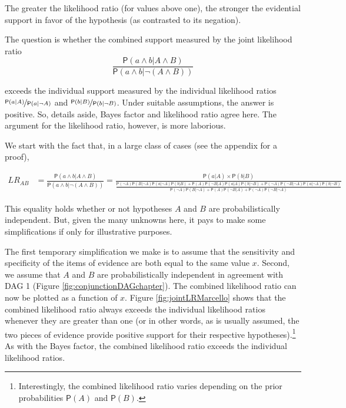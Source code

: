 \documentclass[
  10pt,
  dvipsnames,enabledeprecatedfontcommands]{scrartcl}
\newcommand{\pr}[1]{\ensuremath{\mathsf{P}(#1)}}
\begin{document}
\noindent The greater the likelihood ratio (for values above one), the
stronger the evidential support in favor of the hypothesis (as
contrasted to its negation).

The question is whether the combined support measured by the joint
likelihood ratio
\[\frac{\pr{a\wedge b \vert A\wedge B}}{\pr{a \wedge b \vert \neg (A\wedge B)}}\]

\noindent exceeds the individual support measured by the individual
likelihood ratios \(\nicefrac{\pr{a \vert A}}{\pr{a \vert \neg A}}\) and
\(\nicefrac{\pr{b \vert B}}{\pr{b \vert \neg B}}\). Under suitable
assumptions, the answer is positive. So, details aside, Bayes factor and
likelihood ratio agree here. The argument for the likelihood ratio,
however, is more laborious.

We start with the fact that, in a large class of cases (see the appendix
for a proof),

\begin{align*}
LR_{AB} & = \frac{\pr{a\wedge b \vert A\wedge B}}{\pr{a \wedge b \vert \neg (A\wedge B)}} = \frac{\pr{a \vert A} \times \pr{b \vert B}}
 {\frac{\pr{\neg A}\pr{B \vert \neg A} \pr{a \vert \neg A}\pr{b \vert B} + \pr{A}\pr{\neg B \vert A} \pr{a \vert A }\pr{b \vert \neg B} + \pr{\neg A}\pr{\neg B \vert \neg A } \pr{a \vert \neg A}\pr{b \vert \neg B}}{\pr{\neg A}\pr{B \vert \neg A} + \pr{A}\pr{\neg B \vert A } + \pr{\neg A}\pr{\neg B \vert \neg A} }}
\end{align*}

\noindent This equality holds whether or not hypotheses \(A\) and \(B\)
are probabilistically independent. But, given the many unknowns here, it
pays to make some simplifications if only for illustrative purposes.

The first temporary simplification we make is to assume that the
sensitivity and specificity of the items of evidence are both equal to
the same value \(x\). Second, we assume that \(A\) and \(B\) are
probabilistically independent in agreement with \textsf{DAG 1} (Figure
\ref{fig:conjunctionDAGchapter}). The combined likelihood ratio can now
be plotted as a function of \(x\). Figure \ref{fig:jointLRMarcello}
shows that the combined likelihood ratio always exceeds the individual
likelihood ratios whenever they are greater than one (or in other words,
as is usually assumed, the two pieces of evidence provide positive
support for their respective hypotheses).\footnote{Interestingly, the
  combined likelihood ratio varies depending on the prior probabilities
  \(\pr{A}\) and \(\pr{B}\).} As with the Bayes factor, the combined
likelihood ratio exceeds the individual likelihood ratios.
\end{document}
